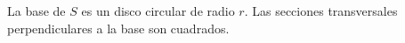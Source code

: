 \item La base de $S$ es un disco circular de radio $r$. Las secciones transversales perpendiculares a la base son cuadrados.
